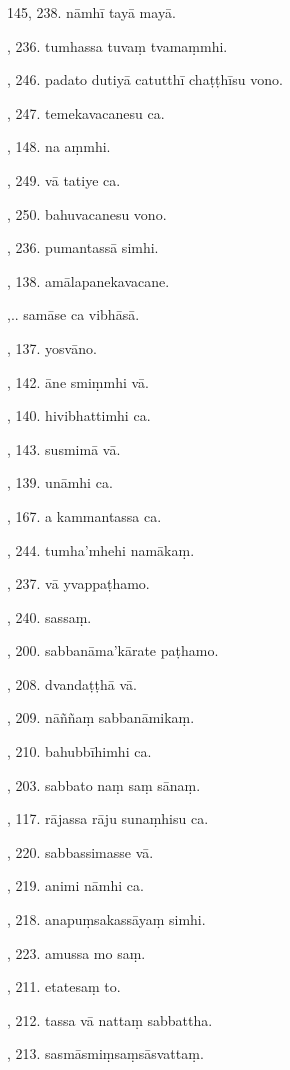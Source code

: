 145, 238. nāmhī tayā mayā.\par {}, 236. tumhassa tuvaṃ tvamaṃmhi.\par {}, 246. padato dutiyā catutthī chaṭṭhīsu vono.\par {}, 247. temekavacanesu ca.\par {}, 148. na aṃmhi.\par {}, 249. vā tatiye ca.\par {}, 250. bahuvacanesu vono.\par {}, 236. pumantassā simhi.\par {}, 138. amālapanekavacane.\par {},.. samāse ca vibhāsā.\par {}, 137. yosvāno.\par {}, 142. āne smiṃmhi vā.\par {}, 140. hivibhattimhi ca.\par {}, 143. susmimā vā.\par {}, 139. unāmhi ca.\par {}, 167. a kammantassa ca.\par {}, 244. tumha’mhehi namākaṃ.\par {}, 237. vā yvappaṭhamo.\par {}, 240. sassaṃ.\par {}, 200. sabbanāma’kārate paṭhamo.\par {}, 208. dvandaṭṭhā vā.\par {}, 209. nāññaṃ sabbanāmikaṃ.\par {}, 210. bahubbīhimhi ca.\par {}, 203. sabbato naṃ saṃ sānaṃ.\par {}, 117. rājassa rāju sunaṃhisu ca.\par {}, 220. sabbassimasse vā.\par {}, 219. animi nāmhi ca.\par {}, 218. anapuṃsakassāyaṃ simhi.\par {}, 223. amussa mo saṃ.\par {}, 211. etatesaṃ to.\par {}, 212. tassa vā nattaṃ sabbattha.\par {}, 213. sasmāsmiṃsaṃsāsvattaṃ.\par \noindent
